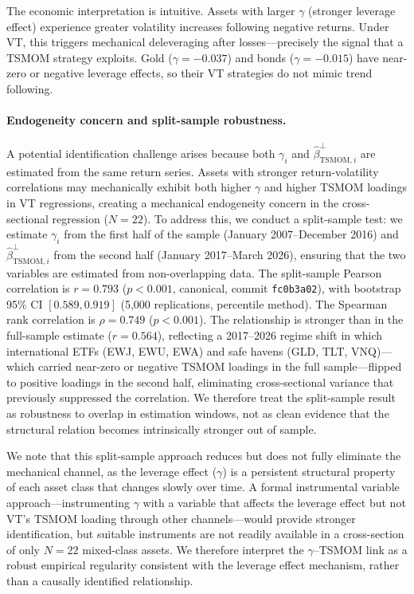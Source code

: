 The economic interpretation is intuitive. Assets with larger $\gamma$ (stronger leverage effect) experience greater volatility increases following negative returns. Under VT, this triggers mechanical deleveraging after losses---precisely the signal that a TSMOM strategy exploits. Gold ($\gamma = -0.037$) and bonds ($\gamma = -0.015$) have near-zero or negative leverage effects, so their VT strategies do not mimic trend following.

\paragraph{Endogeneity concern and split-sample robustness.} A potential identification challenge arises because both $\gamma_i$ and $\hat{\beta}_{\text{TSMOM},i}^{\perp}$ are estimated from the same return series. Assets with stronger return-volatility correlations may mechanically exhibit both higher $\gamma$ and higher TSMOM loadings in VT regressions, creating a mechanical endogeneity concern in the cross-sectional regression ($N = 22$). To address this, we conduct a split-sample test: we estimate $\gamma_i$ from the first half of the sample (January 2007--December 2016) and $\hat{\beta}_{\text{TSMOM},i}^{\perp}$ from the second half (January 2017--March 2026), ensuring that the two variables are estimated from non-overlapping data. The split-sample Pearson correlation is $r = 0.793$ ($p < 0.001$, canonical, commit \texttt{fc0b3a02}), with bootstrap 95\% CI $[0.589, 0.919]$ (5,000 replications, percentile method). The Spearman rank correlation is $\rho = 0.749$ ($p < 0.001$). The relationship is stronger than in the full-sample estimate ($r = 0.564$), reflecting a 2017--2026 regime shift in which international ETFs (EWJ, EWU, EWA) and safe havens (GLD, TLT, VNQ)---which carried near-zero or negative TSMOM loadings in the full sample---flipped to positive loadings in the second half, eliminating cross-sectional variance that previously suppressed the correlation. We therefore treat the split-sample result as robustness to overlap in estimation windows, not as clean evidence that the structural relation becomes intrinsically stronger out of sample.

We note that this split-sample approach reduces but does not fully eliminate the mechanical channel, as the leverage effect ($\gamma$) is a persistent structural property of each asset class that changes slowly over time. A formal instrumental variable approach---instrumenting $\gamma$ with a variable that affects the leverage effect but not VT's TSMOM loading through other channels---would provide stronger identification, but suitable instruments are not readily available in a cross-section of only $N = 22$ mixed-class assets. We therefore interpret the $\gamma$--TSMOM link as a robust empirical regularity consistent with the leverage effect mechanism, rather than a causally identified relationship.

